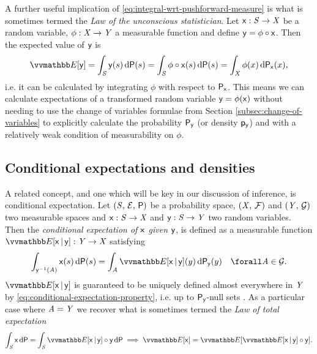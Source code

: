A further useful implication of \eqref{eq:integral-wrt-pushforward-measure} is what is sometimes termed the \emph{Law of the unconscious statistician}. Let $\mathsf{x} : \mathit{S} \to \mathit{X}$ be a random variable, $\phi : \mathit{X} \to \mathit{Y}$ a measurable function and define $\mathsf{y} = \phi \circ \mathsf{x}$. Then the expected value of $\mathsf{y}$ is
\begin{equation}\label{eq:law-of-the-unconscious-statistician}
  \expc{\rvar{y}} = \int_{\set{S}} \rvar{y}(s) \,\dr\probability(s)
  = \int_{\set{S}} \phi \circ \rvar{x}(s) \,\dr\probability(s)
  = \int_{\set{X}} \phi(x) \,\dr\prob{\rvar{x}}(x),
\end{equation}
i.e. it can be calculated by integrating $\phi$ with respect to $\mathsf{P}_{\mathsf{x}}$. This means we can calculate expectations of a transformed random variable $\mathsf{y} = \phi(\mathsf{x})$ without needing to use the change of variables formulae from Section \ref{subsec:change-of-variables} to explicitly calculate the probability $\mathsf{P}_{\mathsf{y}}$ (or density $\mathsf{p}_{\mathsf{y}}$) and with a relatively weak condition of measurability on $\phi$.

\subsection{Conditional expectations and densities}

A related concept, and one which will be key in our discussion of inference, is conditional expectation. Let $(\mathit{S},\,\mathcal{E},\,\mathsf{P})$ be a probability space, $(\mathit{X},\,\mathcal{F})$ and $(\mathit{Y},\,\mathcal{G})$ two measurable spaces and $\mathsf{x} : \mathit{S} \to \mathit{X}$ and $\mathsf{y} : \mathit{S} \to \mathit{Y}$ two random variables. Then the \emph{conditional expectation of $\mathsf{x}$ given $\mathsf{y}$}, is defined as a measurable function $\expc{\rvar{x}\gvn\rvar{y}} : \set{Y} \to \set{X}$ satisfying
\begin{equation}\label{eq:conditional-expectation-property}
  \int_{\rvar{y}^{-1}(\set{A})} \rvar{x}(s) \,\dr\probability(s) =
  \int_{\set{A}} \expc{\rvar{x}\gvn\rvar{y}}(y) \,\dr\prob{\rvar{y}}(y)
  \quad \forall \set{A} \in \sset{G}.
\end{equation}
$\expc{\rvar{x}\gvn\rvar{y}}$ is guaranteed to be uniquely defined almost everywhere in $\mathit{Y}$ by \eqref{eq:conditional-expectation-property}, i.e. up to $\mathsf{P}_{\mathsf{y}}$-null sets \citep{}. As a particular case where $\mathit{A} = \mathit{Y}$ we recover what is sometimes termed the \emph{Law of total expectation}
\begin{equation}\label{eq:law-of-total-expectation}
  \int_{\set{S}} \rvar{x} \,\dr\probability =
  \int_{\set{S}} \expc{\rvar{x}\gvn\rvar{y}} \circ \rvar{y} \,\dr\probability
   \implies
  \expc{\rvar{x}} =
  \expc{\expc{\rvar{x}\gvn\rvar{y}}\circ\rvar{y}}.
\end{equation}

